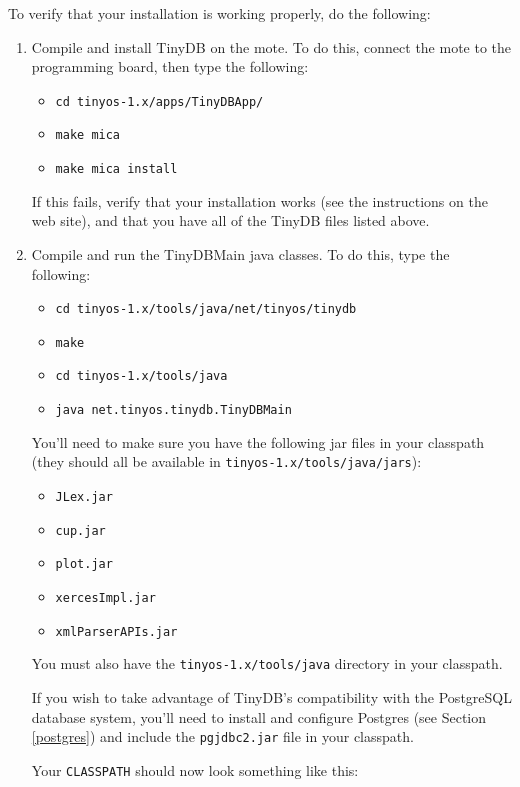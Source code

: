\documentclass[11pt]{article}
\newcommand{\docroot}{tinyos-1.x}
\newcommand{\java}{tinyos-1.x/tools/java}
\begin{document}
\noindent To verify that your installation is working properly, do the following:

\begin{enumerate}
\item Compile and install TinyDB on the mote.  To do this, connect the mote to
the programming board, then type the following:
\begin{itemize}
\item {\tt cd \docroot/apps/TinyDBApp/}
\item {\tt make mica}
\item {\tt make mica install}
\end{itemize}
If this fails, verify that your installation works (see the instructions on the web
site), and that you have all of the TinyDB files listed above.

\item Compile and run the TinyDBMain java classes.  To do this, type the following:
\begin{itemize}
\item {\tt cd {\java}/net/tinyos/tinydb}
\item {\tt make}
\item {\tt cd {\java}}
\item {\tt java net.tinyos.tinydb.TinyDBMain}
\end{itemize}

You'll need to make sure you have the following jar files in your classpath (they should all be available in {\tt {\java}/jars}):
\begin{itemize}
\item {\tt JLex.jar}
\item {\tt cup.jar}
\item {\tt plot.jar}
\item {\tt xercesImpl.jar}
\item {\tt xmlParserAPIs.jar}
\end{itemize}

You must also have the {\tt {\java}} directory in your classpath.  


If you wish to take advantage of TinyDB's compatibility with the PostgreSQL 
database system, you'll need 
to install and configure Postgres (see Section \ref{postgres}) 
 and include the {\tt pgjdbc2.jar} file in your classpath.

Your {\tt CLASSPATH} should now look something like this:


\end{enumerate}
\end{document}
